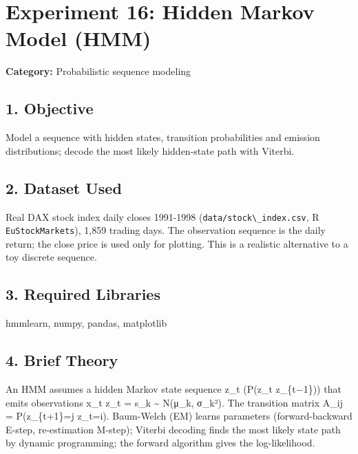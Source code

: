 
\chapter{Experiment 16: Hidden Markov Model
(HMM)}\label{experiment-16-hidden-markov-model-hmm}

\textbf{Category:} Probabilistic sequence modeling

\section{1. Objective}\label{objective}

Model a sequence with hidden states, transition probabilities and
emission distributions; decode the most likely hidden-state path with
Viterbi.

\section{2. Dataset Used}\label{dataset-used}

Real DAX stock index daily closes 1991-1998
(\passthrough{\lstinline!data/stock\_index.csv!}, R
\passthrough{\lstinline!EuStockMarkets!}), 1,859 trading days. The
observation sequence is the daily return; the close price is used only
for plotting. This is a realistic alternative to a toy discrete
sequence.

\section{3. Required Libraries}\label{required-libraries}

hmmlearn, numpy, pandas, matplotlib

\section{4. Brief Theory}\label{brief-theory}

An HMM assumes a hidden Markov state sequence z\_t (P(z\_t \textbar{}
z\_\{t−1\})) that emits observations x\_t \textbar{} z\_t = s\_k
\textasciitilde{} N(μ\_k, σ\_k²). The transition matrix A\_ij =
P(z\_\{t+1\}=j \textbar{} z\_t=i). Baum-Welch (EM) learns parameters
(forward-backward E-step, re-estimation M-step); Viterbi decoding finds
the most likely state path by dynamic programming; the forward algorithm
gives the log-likelihood.

